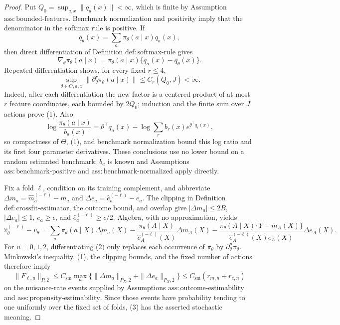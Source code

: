 \documentclass{article}
\begin{document}
\begin{proof}
Put \(Q_0=\sup_{a,x}\|q_a(x)\|<\infty\), which is finite by Assumption \(\mathrm{ass{:}bounded\mbox{-}features}\).  Benchmark normalization and positivity imply that the denominator in the softmax rule is positive.  If
\[
 \bar q_\theta(x)=\sum_a\pi_\theta(a\mid x)q_a(x),
\]
then direct differentiation of Definition \(\mathrm{def{:}softmax\mbox{-}rule}\) gives
\[
 \nabla_\theta\pi_\theta(a\mid x)
 =\pi_\theta(a\mid x)\{q_a(x)-\bar q_\theta(x)\}.
\]
Repeated differentiation shows, for every fixed \(r\leq 4\),
\[
 \sup_{\theta\in\Theta,a,x}\|\partial_\theta^r\pi_\theta(a\mid x)\|
 \leq C_r(Q_0,J)<\infty.                                      \tag{1}
\]
Indeed, after each differentiation the new factor is a centered product of at most \(r\) feature coordinates, each bounded by \(2Q_0\); induction and the finite sum over \(J\) actions prove (1).  Also
\[
 \log\frac{\pi_\theta(a\mid x)}{b_a(x)}
 =\theta^\top q_a(x)-\log\!\sum_r b_r(x)e^{\theta^\top q_r(x)},
\]
so compactness of \(\Theta\), (1), and benchmark normalization bound this log ratio and its first four parameter derivatives.  These conclusions use no lower bound on a random estimated benchmark; \(b_a\) is known and Assumptions \(\mathrm{ass{:}benchmark\mbox{-}positive}\) and \(\mathrm{ass{:}benchmark\mbox{-}normalized}\) apply directly.

Fix a fold \(\ell\), condition on its training complement, and abbreviate
\(\Delta m_a=\widehat m_a^{(-\ell)}-m_a\) and
\(\Delta e_a=\widehat e_a^{(-\ell)}-e_a\).  The clipping in Definition \(\mathrm{def{:}crossfit\mbox{-}estimator}\), the outcome bound, and overlap give
\(|\Delta m_a|\leq2B\), \(|\Delta e_a|\leq1\),
\(e_a\geq\epsilon\), and \(\widehat e_a^{(-\ell)}\geq\epsilon/2\).  Algebra, with no approximation, yields
\[
 \widehat v_\theta^{(-\ell)}-v_\theta
 =\sum_a\pi_\theta(a\mid X)\Delta m_a(X)
 -\frac{\pi_\theta(A\mid X)}{\widehat e_A^{(-\ell)}(X)}\Delta m_A(X)
 -\frac{\pi_\theta(A\mid X)\{Y-m_A(X)\}}
        {\widehat e_A^{(-\ell)}(X)e_A(X)}\Delta e_A(X).        \tag{2}
\]
For \(u=0,1,2\), differentiating (2) only replaces each occurrence of
\(\pi_\theta\) by \(\partial_\theta^u\pi_\theta\).  Minkowski's inequality, (1), the clipping bounds, and the fixed number of actions therefore imply
\[
 \|F_{\ell,u}\|_{P,2}
 \leq C_{\mathrm{sm}}\max_a\{\|\Delta m_a\|_{P_X,2}
                         +\|\Delta e_a\|_{P_X,2}\}
 \leq C_{\mathrm{sm}}(r_{m,n}+r_{e,n})                       \tag{3}
\]
on the nuisance-rate events supplied by Assumptions
\(\mathrm{ass{:}outcome\mbox{-}estimability}\) and
\(\mathrm{ass{:}propensity\mbox{-}estimability}\).  Since those events have probability tending to one uniformly over the fixed set of folds, (3) has the asserted stochastic meaning.


\end{proof}
\end{document}

